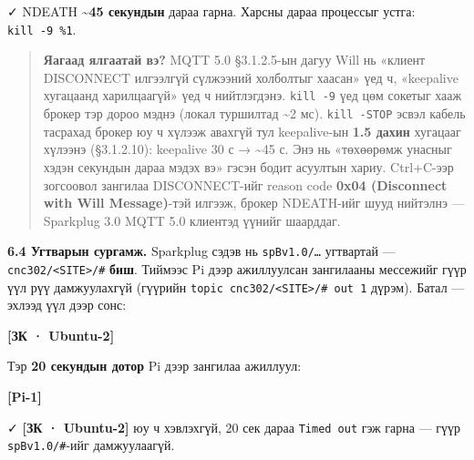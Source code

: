 ✓ NDEATH \textbf{\textasciitilde45 секундын} дараа гарна. Харсны дараа процессыг устга: \texttt{kill\ -9\ \%1}.

\begin{quote}
\textbf{Яагаад ялгаатай вэ?} MQTT 5.0 §3.1.2.5-ын дагуу Will нь «клиент DISCONNECT илгээлгүй сүлжээний холболтыг хаасан» үед ч, «keepalive хугацаанд харилцаагүй» үед ч нийтлэгдэнэ. \texttt{kill\ -9} үед цөм сокетыг хааж брокер тэр дороо мэднэ (локал туршилтад \textasciitilde2 мс). \texttt{kill\ -STOP} эсвэл кабель тасрахад брокер юу ч хүлээж авахгүй тул keepalive-ын \textbf{1.5 дахин} хугацааг хүлээнэ (§3.1.2.10): keepalive 30 с → \textasciitilde45 с. Энэ нь «төхөөрөмж унасныг хэдэн секундын дараа мэдэх вэ» гэсэн бодит асуултын хариу. Ctrl+C-ээр зогсоовол зангилаа DISCONNECT-ийг reason code \textbf{0x04 (Disconnect with Will Message)}-тэй илгээж, брокер NDEATH-ийг шууд нийтэлнэ --- Sparkplug 3.0 MQTT 5.0 клиентэд үүнийг шаарддаг.
\end{quote}

\textbf{6.4 Угтварын сургамж.} Sparkplug сэдэв нь \texttt{spBv1.0/\ldots{}} угтвартай --- \texttt{cnc302/\allowbreak{}\textless{}SITE\textgreater{}/\allowbreak{}\#} \textbf{биш}. Тиймээс Pi дээр ажиллуулсан зангилааны мессежийг гүүр үүл рүү дамжуулахгүй (гүүрийн \texttt{topic\ cnc302/\allowbreak{}\textless{}SITE\textgreater{}/\allowbreak{}\#\ out\ 1} дүрэм). Батал --- эхлээд үүл дээр сонс:

\textbf{{[}ЗК · Ubuntu-2{]}}

\begin{Shaded}
\begin{Highlighting}[]
\end{Highlighting}
\end{Shaded}

Тэр \textbf{20 секундын дотор} Pi дээр зангилаа ажиллуул:

\textbf{{[}Pi-1{]}}

\begin{Shaded}
\begin{Highlighting}[]
 
\end{Highlighting}
\end{Shaded}

✓ \textbf{{[}ЗК · Ubuntu-2{]}} юу ч хэвлэхгүй, 20 сек дараа \texttt{Timed\ out} гэж гарна --- гүүр \texttt{spBv1.0/\#}-ийг дамжуулаагүй.

